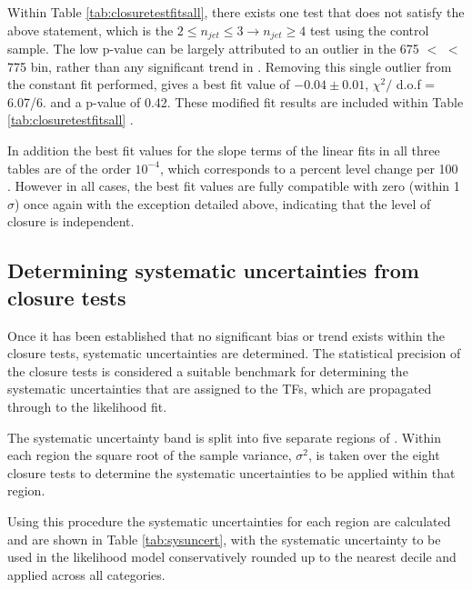 Within Table \ref{tab:closuretestfitsall}, there exists one test that does not satisfy the above statement, which is the $2 \leq n_{jet} \leq 3 \rightarrow n_{jet} \geq 4$ test using the \mupjets control sample. The low p-value can be largely attributed to an outlier in the 675 $<$ \theht $<$ 775 \GeV bin, rather than any significant trend in \theht. Removing this single outlier from the constant fit performed, gives a best fit value of $-0.04 \pm 0.01$, $\chi^{2} /$ d.o.f = 6.07/6. and a p-value of 0.42. These modified fit results are included within Table \ref{tab:closuretestfitsall} .

In addition the best fit values for the slope terms of the linear fits in all three tables are of the order $10^{-4}$, which corresponds to a percent level change per 100 \GeV. However in all cases, the best fit values are fully compatible with zero (within 1$\sigma$) once again with the exception detailed above, indicating that the level of closure is \theht independent.

\subsection{Determining systematic uncertainties from closure tests}
\label{subsec:determinesystematics}

Once it has been established that no significant bias or trend exists within the closure tests, systematic uncertainties are determined. The statistical precision of the closure tests is considered a suitable benchmark for determining the systematic uncertainties that are assigned to the \ac{TF}s, which are propagated through to the likelihood fit.

The systematic uncertainty band is split into five separate regions of \theht. Within each region the square root of the sample variance, $\sigma^{2}$, is taken over the eight closure tests to determine the systematic uncertainties to be applied within that region.

Using this procedure the systematic uncertainties for each region are calculated and are shown in Table \ref{tab:sysuncert}, with the systematic uncertainty to be used in the likelihood model conservatively rounded up to the nearest decile and applied across all \nbreco categories.

